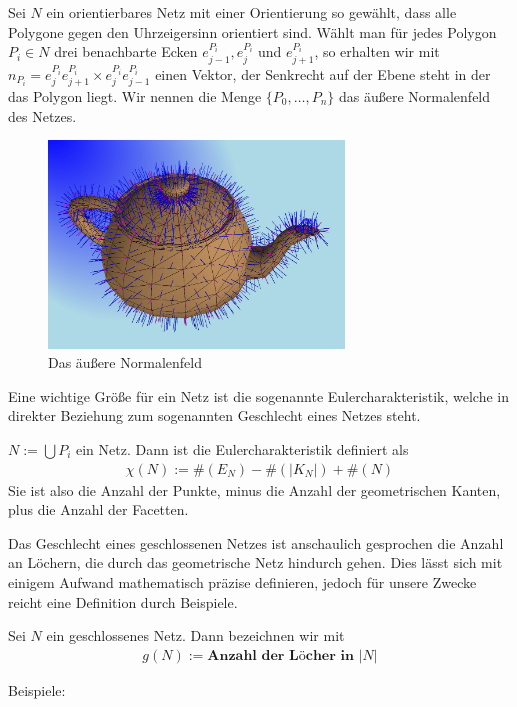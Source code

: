 \begin{Definition}
Sei $N$ ein orientierbares Netz mit einer Orientierung so gewählt, dass  alle Polygone gegen den Uhrzeigersinn orientiert sind. Wählt man für jedes Polygon $P_i \in N$ drei benachbarte Ecken $e_{j-1}^{P_i}, e_{j}^{P_i}$ und $e_{j+1}^{P_i}$, so erhalten wir
mit $n_{P_i} = e_{j}^{P_i}e_{j+1}^{P_i} \times e_{j}^{P_i}e_{j-1}^{P_i}$ einen Vektor, der Senkrecht auf der Ebene steht in der das Polygon liegt. Wir nennen die Menge $\{P_0, \hdots, P_n\}$ das äußere Normalenfeld des Netzes. 
\end{Definition}


\begin{figure}[H]
    \centering
    \includegraphics[width=0.7\textwidth]{images/teapot-normals.png}
    \caption{Das äußere Normalenfeld}
    \label{fig:outer-normals}
\end{figure}
Eine wichtige Größe für ein Netz ist die sogenannte Eulercharakteristik, welche in direkter Beziehung zum sogenannten Geschlecht eines Netzes steht.

\begin{Definition}
$N:= \bigcup P_i$ ein Netz. Dann ist die Eulercharakteristik definiert als
\begin{align*}
\chi(N):= \#(E_N) - \#(|K_N|) + \#(N) 
\end{align*}
Sie ist also die Anzahl der  Punkte, minus die Anzahl der geometrischen Kanten, plus die Anzahl der Facetten.
\end{Definition}

Das Geschlecht eines geschlossenen Netzes ist anschaulich gesprochen die Anzahl an Löchern, die durch das geometrische Netz hindurch gehen. Dies lässt sich mit einigem Aufwand mathematisch präzise definieren, jedoch für unsere Zwecke reicht eine Definition durch Beispiele.
\begin{Definition}
Sei $N$ ein geschlossenes Netz. Dann bezeichnen wir mit
\begin{align*}
g(N):= \textbf{Anzahl der Löcher in } |N|
\end{align*}
\end{Definition}
Beispiele:

